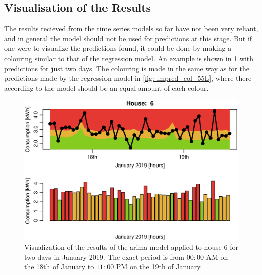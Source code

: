 \subsection{Visualisation of the Results}
The results recieved from the time series models so far have not been very reliant, and in general the model should not be used for predictions at this stage. But if one were to visualize the predictions found, it could be done by making a colouring similar to that of the regression model. An example is shown in \cref{fig:app6} with predictions for just two days. The colouring is made in the same way as for the predictions made by the regression model in \cref{fig: lmpred_col_55L}, where there according to the model should be an equal amount of each colour.
\begin{figure}[!htb]
    \centering
    \includegraphics[scale=0.7]{../../../figures/AppHour6.eps}
    \caption{Visualization of the results of the arima model applied to house 6 for two days in January 2019. The exact period is from $00:00$ AM on the 18th of January to $11:00$ PM on the 19th of January.}
    \label{fig:app6}
\end{figure}


